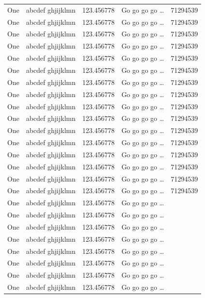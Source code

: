 \documentclass[phd]{ndsu-thesis-2022}
\begin{document}
\begin{longtable}{l l l l r}
One & abcdef ghjijklmn & 123.456778  & Go go go go \ldots & \num{71294539}\\
One & abcdef ghjijklmn & 123.456778  & Go go go go \ldots & \num{71294539}\\
One & abcdef ghjijklmn & 123.456778  & Go go go go \ldots & \num{71294539}\\
One & abcdef ghjijklmn & 123.456778  & Go go go go \ldots & \num{71294539}\\
One & abcdef ghjijklmn & 123.456778  & Go go go go \ldots & \num{71294539}\\
One & abcdef ghjijklmn & 123.456778  & Go go go go \ldots & \num{71294539}\\
One & abcdef ghjijklmn & 123.456778  & Go go go go \ldots & \num{71294539}\\
One & abcdef ghjijklmn & 123.456778  & Go go go go \ldots & \num{71294539}\\
One & abcdef ghjijklmn & 123.456778  & Go go go go \ldots & \num{71294539}\\
One & abcdef ghjijklmn & 123.456778  & Go go go go \ldots & \num{71294539}\\
One & abcdef ghjijklmn & 123.456778  & Go go go go \ldots & \num{71294539}\\
One & abcdef ghjijklmn & 123.456778  & Go go go go \ldots & \num{71294539}\\
One & abcdef ghjijklmn & 123.456778  & Go go go go \ldots & \num{71294539}\\
One & abcdef ghjijklmn & 123.456778  & Go go go go \ldots & \num{71294539}\\
One & abcdef ghjijklmn & 123.456778  & Go go go go \ldots & \num{71294539}\\
One & abcdef ghjijklmn & 123.456778  & Go go go go \ldots & \num{71294539}\\
One & abcdef ghjijklmn & 123.456778  & Go go go go \ldots \\
One & abcdef ghjijklmn & 123.456778  & Go go go go \ldots \\
One & abcdef ghjijklmn & 123.456778  & Go go go go \ldots \\
One & abcdef ghjijklmn & 123.456778  & Go go go go \ldots \\
One & abcdef ghjijklmn & 123.456778  & Go go go go \ldots \\
One & abcdef ghjijklmn & 123.456778  & Go go go go \ldots \\
One & abcdef ghjijklmn & 123.456778  & Go go go go \ldots \\
One & abcdef ghjijklmn & 123.456778  & Go go go go \ldots \\

\end{longtable}
\end{document}
